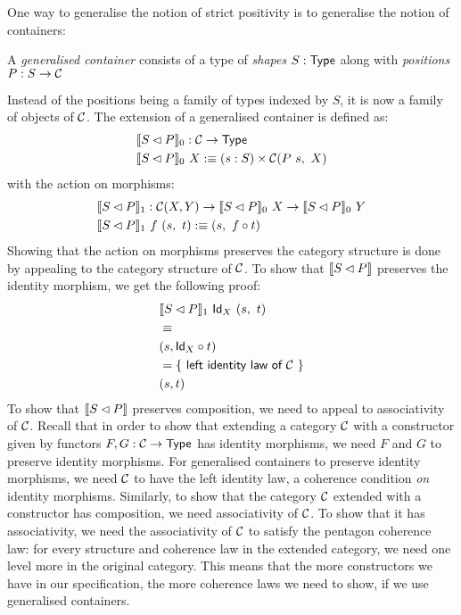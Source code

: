 \documentclass[a4paper,10pt]{report}
\begin{document}
One way to generalise the notion of strict positivity is to generalise
the notion of containers:
%
\begin{defn}
  A \emph{generalised container} consists of a type of \emph{shapes}
  $S : \mathsf{Type}$ along with \emph{positions} $P : S \to \mathcal{C}$
\end{defn}
%
Instead of the positions being a family of types indexed by $S$, it is
now a family of objects of $\mathcal{C}$. The extension of a generalised
container is defined as:
%
\begin{align*}
  &\llbracket S \lhd P \rrbracket_0 : \mathcal{C} \to \mathsf{Type} \\
  &\llbracket S \lhd P \rrbracket_0 \ X :\equiv (s : S) \times \mathcal{C}(P \ s,\ X)
\end{align*}
%
with the action on morphisms:
%
\begin{align*}
  &\llbracket S \lhd P \rrbracket_1 : \mathcal{C}(X , Y) \to \llbracket S \lhd P \rrbracket_0 \ X \to \llbracket S \lhd P \rrbracket_0 \ Y \\
  &\llbracket S \lhd P \rrbracket_1 \ f \ (s ,\ t) :\equiv (s ,\ f \circ t)
\end{align*}
%
Showing that the action on morphisms preserves the category structure
is done by appealing to the category structure of $\mathcal{C}$. To show that
$\llbracket S \lhd P \rrbracket$ preserves the identity morphism, we get the following
proof:
%
\begin{align*}
&\llbracket S \lhd P \rrbracket_1 \ \mathsf{Id}_{X} \ (s ,\ t) \\
&\equiv \\
&(s , \mathsf{Id}_{X} \circ t) \\
&= \{\ \textsf{left identity law of $\mathcal{C}$}\ \} \\
&(s, t)
\end{align*}
%
To show that $\llbracket S \lhd P \rrbracket$ preserves composition, we need to appeal to
associativity of $\mathcal{C}$. Recall that in order to show that extending a
category $\mathcal{C}$ with a constructor given by functors
$F, G : \mathcal{C} \to \mathsf{Type}$ has identity morphisms, we need $F$ and $G$ to
preserve identity morphisms. For generalised containers to preserve
identity morphisms, we need $\mathcal{C}$ to have the left identity law, a
coherence condition \emph{on} identity morphisms. Similarly, to show
that the category $\mathcal{C}$ extended with a constructor has composition, we
need associativity of $\mathcal{C}$. To show that it has associativity, we need
the associativity of $\mathcal{C}$ to satisfy the pentagon coherence law: for
every structure and coherence law in the extended category, we need
one level more in the original category. This means that the more
constructors we have in our specification, the more coherence laws we
need to show, if we use generalised containers.
\end{document}
